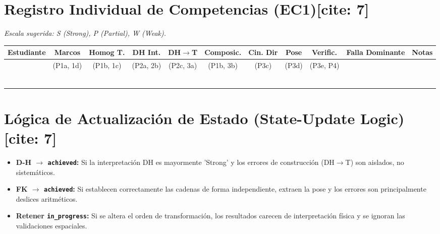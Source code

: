 \documentclass[11pt, a4paper, landscape]{article}
\begin{document}
\section*{Registro Individual de Competencias (EC1)[cite: 7]}
\textit{Escala sugerida: S (Strong), P (Partial), W (Weak).}

\vspace{0.4cm}
{ \footnotesize %
\renewcommand{\arraystretch}{1.5}
\noindent\begin{tabularx}{\textwidth}{|>{\hsize=1.2\hsize}X|c|c|c|c|c|c|c|c|>{\hsize=0.8\hsize}X|>{\hsize=1.0\hsize}X|}
\hline
\rowcolor{ucbblue!20} \textbf{Estudiante} & \textbf{Marcos} & \textbf{Homog T.} & \textbf{DH Int.} & \textbf{DH$\to$T} & \textbf{Composic.} & \textbf{Cin. Dir} & \textbf{Pose} & \textbf{Verific.} & \textbf{Falla Dominante} & \textbf{Notas} \\ \hline
 & (P1a, 1d) & (P1b, 1c) & (P2a, 2b) & (P2c, 3a) & (P1b, 3b) & (P3c) & (P3d) & (P3e, P4) & & \\ \hline
 & & & & & & & & & & \\ \hline
 & & & & & & & & & & \\ \hline
 & & & & & & & & & & \\ \hline
 & & & & & & & & & & \\ \hline
 & & & & & & & & & & \\ \hline
 & & & & & & & & & & \\ \hline
\end{tabularx}
}

\vspace{1cm}
\section*{Lógica de Actualización de Estado (State-Update Logic)[cite: 7]}
\begin{itemize}
    \item \textbf{D-H $\to$ \texttt{achieved}:} Si la interpretación DH es mayormente 'Strong' y los errores de construcción (DH$\to$T) son aislados, no sistemáticos.
    \item \textbf{FK $\to$ \texttt{achieved}:} Si establecen correctamente las cadenas de forma independiente, extraen la pose y los errores son principalmente deslices aritméticos.
    \item \textbf{Retener \texttt{in\_progress}:} Si se altera el orden de transformación, los resultados carecen de interpretación física y se ignoran las validaciones espaciales.
\end{itemize}
\end{document}
